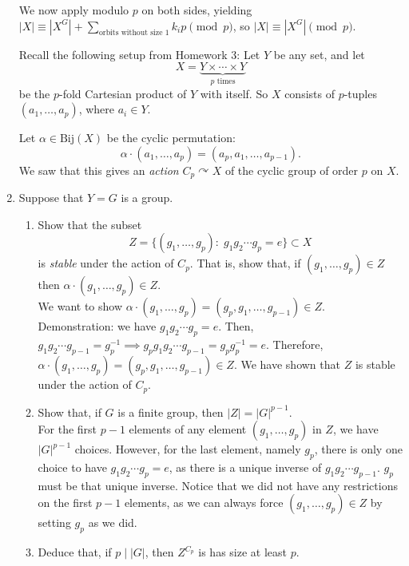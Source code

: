 \documentclass{amsart}
\begin{document}
\begin{enumerate}
We now apply modulo $p$ on both sides, yielding $|X|\equiv|X^G|+\sum_{\text{orbits without size 1}}k_ip\pmod p$, so $|X|\equiv|X^G|\pmod p$.



\vspace{0.2in}
Recall the following setup from Homework 3:  Let $Y$ be any set, and let
\[
X = \underbrace{Y\times \cdots \times Y}_\text{$p$ times}
\]
be the $p$-fold Cartesian product of $Y$ with itself. So $X$ consists of $p$-tuples $(a_1,\ldots,a_p)$, where $a_i\in Y$. 

Let $\alpha\in \mathrm{Bij}(X)$ be the cyclic permutation:
\[
\alpha\cdot (a_1,\ldots,a_p) = (a_p,a_1,\ldots,a_{p-1}).
\]
We saw that this gives an \emph{action} $C_p\curvearrowright X$ of the cyclic group of order $p$ on $X$.

\vspace{0.2in}

\item Suppose that $Y = G$ is a group.
\begin{enumerate}
	\item Show that the subset
	\[
     Z =  \{(g_1,\ldots,g_p):\;g_1g_2\cdots g_p = e\}\subset X
	\]
	is \emph{stable} under the action of $C_p$. That is, show that, if $(g_1,\ldots,g_p)\in Z$ then $\alpha\cdot (g_1,\ldots,g_p)\in Z$.\\

    We want to show $\alpha\cdot(g_1,\ldots,g_p)=(g_p,g_1,\dots,g_{p-1})\in Z$.\\

    Demonstration: we have $g_1g_2\cdots g_p=e$. Then, $g_1g_2\cdots g_{p-1}=g_p^{-1}\implies g_pg_1g_2\cdots g_{p-1}=g_pg_p^{-1}=e$. Therefore, $\alpha\cdot(g_1,\ldots,g_p)=(g_p,g_1,\dots,g_{p-1})\in Z$. We have shown that $Z$ is stable under the action of $C_p$.

	\item Show that, if $G$ is a finite group, then $|Z| = |G|^{p-1}$.\\

    For the first $p-1$ elements of any element $(g_1,\dots,g_p)$ in $Z$, we have $|G|^{p-1}$ choices. However, for the last element, namely $g_p$, there is only one choice to have $g_1g_2\cdots g_p=e$, as there is a unique inverse of $g_1g_2\cdots g_{p-1}$. $g_p$ must be that unique inverse. Notice that we did not have any restrictions on the first $p-1$ elements, as we can always force $(g_1,\dots,g_p)\in Z$ by setting $g_p$ as we did.

	\item Deduce that, if $p\mid |G|$, then $Z^{C_p}$ is has size at least $p$.\\


\end{enumerate}
\end{enumerate}
\end{document}
